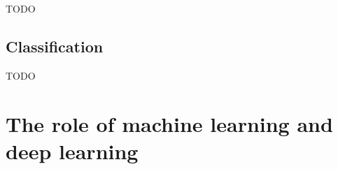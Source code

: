 

TODO


\subsection{Classification}
\label{subsec:processing_signals_general_pipeline_classification}

TODO




\section{The role of machine learning and deep learning}
\label{sec:processing_signals_ml_and_dl}






